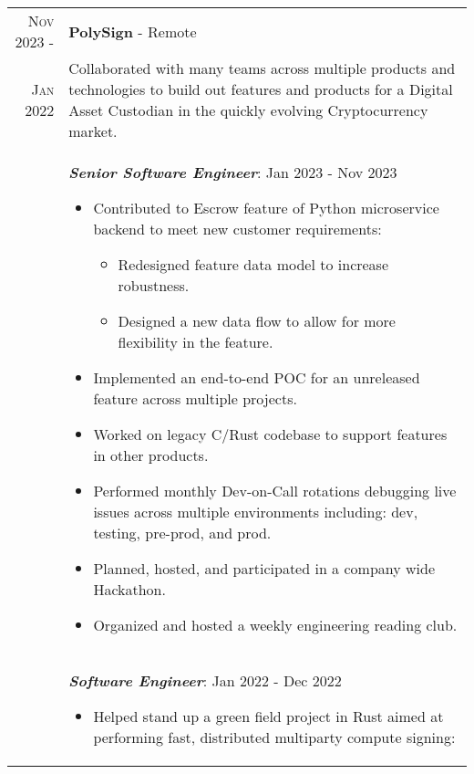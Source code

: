 \documentclass[a4paper,12pt]{article}
\begin{document}
%
%
\begin{tabularx}{\textwidth}{r|X}
   \textsc{Nov 2023 \--} & \textbf{PolySign} \-- Remote \\
   \textsc{Jan 2022} & \small{Collaborated with many teams across multiple products and technologies to build out features and products for a Digital Asset Custodian in the quickly evolving Cryptocurrency market.} \\
   & \emph{\textbf{Senior Software Engineer}}: Jan 2023 \-- Nov 2023
   \begin{itemize}[leftmargin=20pt,topsep=1pt,itemsep=1pt,partopsep=0pt, parsep=1pt]
        \item Contributed to Escrow feature of Python microservice backend to meet new customer requirements:
            \begin{itemize}[leftmargin=20pt,topsep=1pt,itemsep=1pt,partopsep=0pt, parsep=1pt]
              \item Redesigned feature data model to increase robustness.
              \item Designed a new data flow to allow for more flexibility in the feature.
            \end{itemize}
        \item Implemented an end-to-end POC for an unreleased feature across multiple projects.
        \item Worked on legacy C/Rust codebase to support features in other products.
        \item Performed monthly Dev-on-Call rotations debugging live issues across multiple environments including: dev, testing, pre-prod, and prod.
        \item Planned, hosted, and participated in a company wide Hackathon.
        \item Organized and hosted a weekly engineering reading club.
      \end{itemize}\\
   & \emph{\textbf{Software Engineer}}: Jan 2022 \-- Dec 2022
   \begin{itemize}[leftmargin=20pt,topsep=1pt,itemsep=1pt,partopsep=0pt, parsep=1pt]
        \item Helped stand up a green field project in Rust aimed at performing fast, distributed multiparty compute signing:

\end{itemize}
\end{tabularx}
\end{document}

